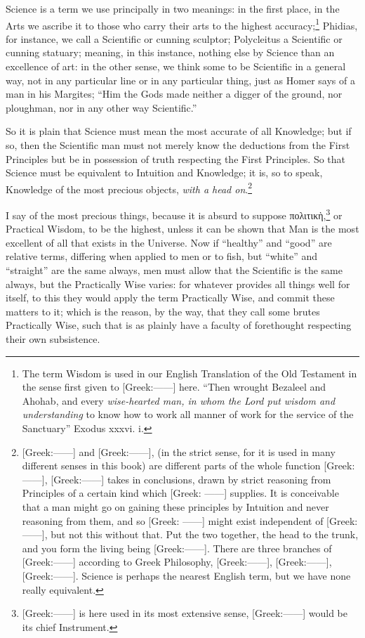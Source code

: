 Science is a term we use principally in two meanings: in the first place, in
the Arts we ascribe it to those who carry their arts to the highest
accuracy;\footnote{The term Wisdom is used in our English Translation of the Old Testament in the
sense first given to [Greek:——] here. “Then wrought Bezaleel
and Ahohab, and every \emph{wise-hearted man, in whom the Lord put wisdom and
understanding} to know how to work all manner of work for the service of the
Sanctuary” Exodus xxxvi. i.}
Phidias, for instance, we call a Scientific or cunning sculptor; Polycleitus a
Scientific or cunning statuary; meaning, in this instance, nothing else by
Science than an excellence of art: in the other sense, we think some to be
Scientific in a general way, not in any particular line or in any particular
thing, just as Homer says of a man in his Margites; “Him the Gods made
neither a digger of the ground, nor ploughman, nor in any other way
Scientific.”

So it is plain that Science must mean the most accurate of all Knowledge; but
if so, then the Scientific man must not merely know the deductions from the
First Principles but be in possession of truth respecting the First Principles.
So that Science must be equivalent to Intuition and Knowledge; it is, so to
speak, Knowledge of the most precious objects, \emph{with a head
on}.\footnote{[Greek:——] and [Greek:——], (in the strict sense, for it
is used in many different senses in this book) are different parts of the whole
function [Greek:——], [Greek:——] takes in conclusions,
drawn by strict reasoning from Principles of a certain kind which [Greek:
——] supplies. It is conceivable that a man might go on gaining
these principles by Intuition and never reasoning from them, and so [Greek:
——] might exist independent of [Greek:——], but not this
without that. Put the two together, the head to the trunk, and you form the
living being [Greek:——]. There are three branches of
[Greek:——] according to Greek Philosophy, [Greek:——],
[Greek:——], [Greek:——]. Science is perhaps the nearest
English term, but we have none really equivalent.}

I say of the most precious things, because it is absurd to suppose
πολιτικὴ,\footnote{[Greek:——] is here used in its most extensive sense,
[Greek:——] would be its chief Instrument.}
or Practical Wisdom, to be the highest, unless it can be shown that Man is the
most excellent of all that exists in the Universe. Now if “healthy”
and “good” are relative terms, differing when applied to men or to
fish, but “white” and “straight” are the same always,
men must allow that the Scientific is the same always, but the Practically Wise
varies: for whatever provides all things well for itself, to this they would
apply the term Practically Wise, and commit these matters to it; which is the
reason, by the way, that they call some brutes Practically Wise, such that is
as plainly have a faculty of forethought respecting their own subsistence.

